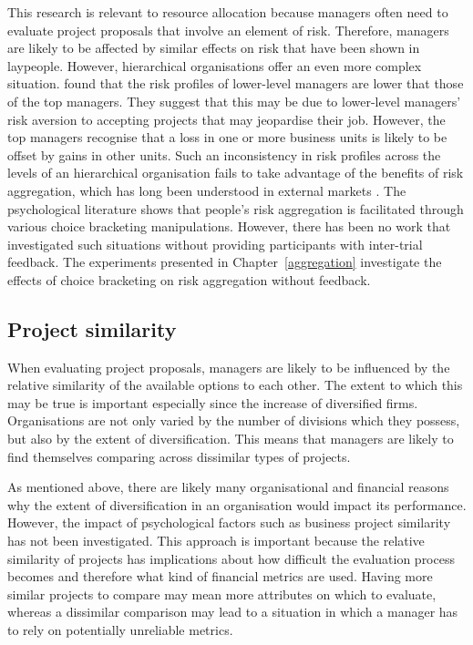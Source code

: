 \documentclass[a4paper, nobind, dvipsnames]{templates/ociamthesis}
\theoremstyle{definition}
\theoremstyle{definition}
\theoremstyle{definition}
\theoremstyle{definition}
\theoremstyle{remark}
\begin{document}
This research is relevant to resource allocation because managers often need to
evaluate project proposals that involve an element of risk. Therefore, managers
are likely to be affected by similar effects on risk that have been shown in
laypeople. However, hierarchical organisations offer an even more complex
situation. \textcite{lovallo2020} found that the risk profiles of lower-level managers are
lower that those of the top managers. They suggest that this may be due to
lower-level managers' risk aversion to accepting projects that may jeopardise
their job. However, the top managers recognise that a loss in one or more
business units is likely to be offset by gains in other units. Such an
inconsistency in risk profiles across the levels of an hierarchical organisation
fails to take advantage of the benefits of risk aggregation, which has long been
understood in external markets \autocite{markowitz1952}. The psychological literature
shows that people's risk aggregation is facilitated through various choice
bracketing manipulations. However, there has been no work that investigated such
situations without providing participants with inter-trial feedback. The
experiments presented in Chapter~\ref{aggregation} investigate the effects of
choice bracketing on risk aggregation without feedback.

\hypertarget{project-similarity}{%
\subsection{Project similarity}\label{project-similarity}}

When evaluating project proposals, managers are likely to be influenced by the
relative similarity of the available options to each other. The extent to which
this may be true is important especially since the increase of diversified
firms. Organisations are not only varied by the number of divisions which they
possess, but also by the extent of diversification. This means that managers are
likely to find themselves comparing across dissimilar types of projects.

As mentioned above, there are likely many organisational and financial reasons
why the extent of diversification in an organisation would impact its
performance. However, the impact of psychological factors such as business
project similarity has not been investigated. This approach is important because
the relative similarity of projects has implications about how difficult the
evaluation process becomes and therefore what kind of financial metrics are
used. Having more similar projects to compare may mean more attributes on which
to evaluate, whereas a dissimilar comparison may lead to a situation in which a
manager has to rely on potentially unreliable metrics.
\end{document}
